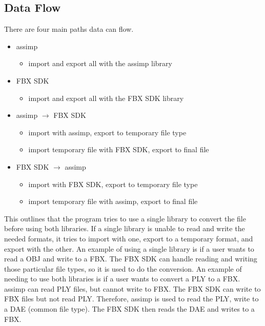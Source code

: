     \subsection{Data Flow}
        There are four main paths data can flow.
        \begin{itemize}
            \item assimp
            \begin{itemize}
                \item import and export all with the assimp library
            \end{itemize}
            
            \item FBX SDK
            \begin{itemize}
                \item import and export all with the FBX SDK library
            \end{itemize}

            \item assimp $\rightarrow$ FBX SDK
            \begin{itemize}
                \item import with assimp, export to temporary file type
                \item import temporary file with FBX SDK, export to final file 
            \end{itemize}

            \item FBX SDK $\rightarrow$ assimp
            \begin{itemize}
                \item import with FBX SDK, export to temporary file type
                \item import temporary file with assimp, export to final file 
            \end{itemize}
        \end{itemize}
        
        This outlines that the program tries to use a single library to convert the file before using both libraries.  If a single library is unable to 
        read and write the needed formats, it tries to import with one, export to a temporary format, and export with the other.  An example of 
        using a single library is if a user wants to read a OBJ and write to a FBX.  The FBX SDK can handle reading and writing those particular file
        types, so it is used to do the conversion.  An example of needing to use both libraries is if a user wants to convert a PLY to a FBX.
        assimp can read PLY files, but cannot write to FBX.  The FBX SDK can write to FBX files but not read PLY.  Therefore, assimp is used to 
        read the PLY, write to a DAE (common file type).  The FBX SDK then reads the DAE and writes to a FBX.

